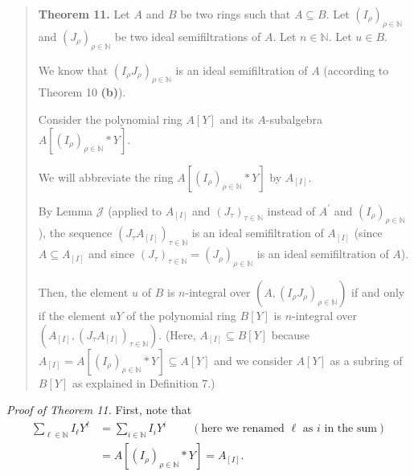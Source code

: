 \documentclass[12pt,final,notitlepage,onecolumn]{article}%
\begin{document}
\begin{quote}
\textbf{Theorem 11.} Let $A$ and $B$ be two rings such that $A\subseteq B$.
Let $\left(  I_{\rho}\right)  _{\rho\in\mathbb{N}}$ and $\left(  J_{\rho
}\right)  _{\rho\in\mathbb{N}}$ be two ideal semifiltrations of $A$. Let
$n\in\mathbb{N}$. Let $u\in B$.

We know that $\left(  I_{\rho}J_{\rho}\right)  _{\rho\in\mathbb{N}}$ is an
ideal semifiltration of $A$ (according to Theorem 10 \textbf{(b)}).

Consider the polynomial ring $A\left[  Y\right]  $ and its $A$-subalgebra
$A\left[  \left(  I_{\rho}\right)  _{\rho\in\mathbb{N}}\ast Y\right]  $.

We will abbreviate the ring $A\left[  \left(  I_{\rho}\right)  _{\rho
\in\mathbb{N}}\ast Y\right]  $ by $A_{\left[  I\right]  }$.

By Lemma $\mathcal{J}$ (applied to $A_{\left[  I\right]  }$ and $\left(
J_{\tau}\right)  _{\tau\in\mathbb{N}}$ instead of $A^{\prime}$ and $\left(
I_{\rho}\right)  _{\rho\in\mathbb{N}}$), the sequence $\left(  J_{\tau
}A_{\left[  I\right]  }\right)  _{\tau\in\mathbb{N}}$ is an ideal
semifiltration of $A_{\left[  I\right]  }$ (since $A\subseteq A_{\left[
I\right]  }$ and since $\left(  J_{\tau}\right)  _{\tau\in\mathbb{N}}=\left(
J_{\rho}\right)  _{\rho\in\mathbb{N}}$ is an ideal semifiltration of $A$).

Then, the element $u$ of $B$ is $n$-integral over $\left(  A,\left(  I_{\rho
}J_{\rho}\right)  _{\rho\in\mathbb{N}}\right)  $ if and only if the element
$uY$ of the polynomial ring $B\left[  Y\right]  $ is $n$-integral over
$\left(  A_{\left[  I\right]  },\left(  J_{\tau}A_{\left[  I\right]  }\right)
_{\tau\in\mathbb{N}}\right)  .$ (Here, $A_{\left[  I\right]  }\subseteq
B\left[  Y\right]  $ because $A_{\left[  I\right]  }=A\left[  \left(  I_{\rho
}\right)  _{\rho\in\mathbb{N}}\ast Y\right]  \subseteq A\left[  Y\right]  $
and we consider $A\left[  Y\right]  $ as a subring of $B\left[  Y\right]  $ as
explained in Definition 7.)
\end{quote}

\textit{Proof of Theorem 11.} First, note that%
\begin{align*}
\sum\limits_{\ell\in\mathbb{N}}I_{\ell}Y^{\ell}  &  =\sum\limits_{i\in
\mathbb{N}}I_{i}Y^{i}\ \ \ \ \ \ \ \ \ \ \left(  \text{here we renamed }%
\ell\text{ as }i\text{ in the sum}\right) \\
&  =A\left[  \left(  I_{\rho}\right)  _{\rho\in\mathbb{N}}\ast Y\right]
=A_{\left[  I\right]  }.
\end{align*}
\end{document}
